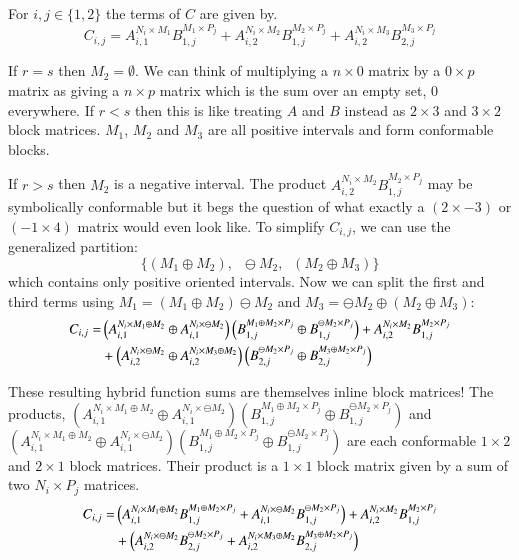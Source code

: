 For $i,j \in \{ 1,2 \}$ the terms of $C$ are given by.
\begin{equation}
	C_{i,j} 	= A_{i,1}^{N_i \times M_1} B_{1,j}^{M_1 \times P_j} 
			+ A_{i,2}^{N_i \times M_2} B_{1,j}^{M_2 \times P_j}
			+ A_{i,2}^{N_i \times M_3} B_{2,j}^{M_3 \times P_j}
\end{equation}

If $r=s$ then $M_2 = \emptyset$.
We can think of multiplying a $n \times 0$ matrix by a $0 \times p$ matrix as giving a $n \times p$ matrix which is the sum
over an empty set, 0 everywhere.
If $r < s$ then this is like treating $A$ and $B$ instead as $2 \times 3$ and $3 \times 2$ block matrices.
$M_1$, $M_2$ and $M_3$ are all positive intervals and form conformable blocks.

If $r > s$ then $M_2$ is a negative interval.
The product $A_{i,2}^{N_i \times M_2} B_{1,j}^{M_2 \times P_j}$ may be symbolically conformable but it begs the 
question of what exactly a $(2 \times -3)$ or $(-1 \times 4)$ matrix would even look like.
To simplify $C_{i,j}$, we can use the generalized partition:
\begin{equation*}
 	\Big\{ \left(M_1 \oplus M_2\right), \;\; \ominus M_2, \;\; \left(M_2 \oplus M_3\right) \Big\}
\end{equation*}
which contains only positive oriented intervals.
Now we can split the first and third terms using $M_1 = (M_1 \oplus M_2) \ominus M_2$ 
and $M_3 = \ominus M_2 \oplus (M_2 \oplus M_3)$:
\begin{align*}
	C_{i,j} 	= &\left( A_{i,1}^{N_i \times M_1 \oplus M_2} \oplus A_{i,1}^{N_i \times \ominus M_2} \right)
				\left( B_{1,j}^{M_1 \oplus M_2 \times P_j} \oplus B_{1,j}^{\ominus M_2 \times P_j} \right)
			+ A_{i,2}^{N_i \times M_2} B_{1,j}^{M_2 \times P_j} \notag\\
			&+ \left( A_{i,2}^{N_i \times \ominus M_2} \oplus A_{i,2}^{N_i \times M_3 \oplus M_2} \right)
			 \left( B_{2,j}^{\ominus M_2 \times P_j} \oplus B_{2,j}^{M_3 \oplus M_2 \times P_j} \right)
\end{align*}

These resulting hybrid function sums are themselves inline block matrices!
The products, $\left( A_{i,1}^{N_i \times M_1 \oplus M_2} \oplus A_{i,1}^{N_i \times \ominus M_2} \right)
	  \left( B_{1,j}^{M_1 \oplus M_2 \times P_j} \oplus B_{1,j}^{\ominus M_2 \times P_j} \right)$
and $\left( A_{i,1}^{N_i \times M_1 \oplus M_2} \oplus A_{i,1}^{N_i \times \ominus M_2} \right)
	  \left( B_{1,j}^{M_1 \oplus M_2 \times P_j} \oplus B_{1,j}^{\ominus M_2 \times P_j} \right)$	 
are each conformable $1 \times 2$ and $2 \times 1$ block matrices.
Their product is a $1 \times 1$ block matrix given by a sum of two $N_i \times P_j$ matrices.
\begin{align*}
	C_{i,j} 	= & \left( A_{i,1}^{N_i \times M_1 \oplus M_2} B_{1,j}^{M_1 \oplus M_2 \times P_j}
			+ A_{i,1}^{N_i \times \ominus M_2} B_{1,j}^{\ominus M_2 \times P_j} \right)
			+ A_{i,2}^{N_i \times M_2} B_{1,j}^{M_2 \times P_j} \notag\\
			&+ \left( A_{i,2}^{N_i \times \ominus M_2} B_{2,j}^{\ominus M_2 \times P_j}
			+ A_{i,2}^{N_i \times M_3 \oplus M_2} B_{2,j}^{M_3 \oplus M_2 \times P_j} \right)
\end{align*}

